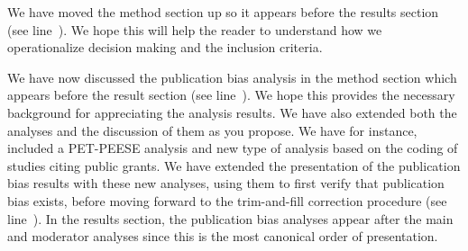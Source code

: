 
We have moved the method section up so it appears before the results section (see line~). We hope this will help the reader to understand how we operationalize decision making and the inclusion criteria.  



We have now discussed the publication bias analysis in the method section which appears before the result section (see line~). We hope this provides the necessary background for appreciating the analysis results. We have also extended both the analyses and the discussion of them as you propose. We have for instance, included a PET-PEESE analysis and new type of analysis based on the coding of studies citing public grants. We have extended the presentation of the publication bias results with these new analyses, using them to first verify that publication bias exists, before moving forward to the trim-and-fill correction procedure (see line~). In the results section, the publication bias analyses appear after the main and moderator analyses since this is the most canonical order of presentation.



